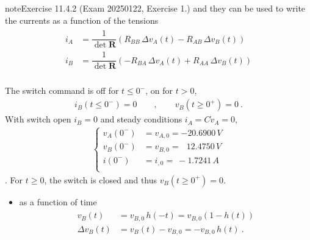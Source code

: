 \documentclass[letterpaper,10pt,english]{jupyterBook}
\begin{document}
\begin{sphinxadmonition}{note}{Exercise 11.4.2 (Exam 2025\sphinxhyphen{}01\sphinxhyphen{}22, Exercise 1.)}
\sphinxAtStartPar
and they can be used to write the currents as a function of the tensions
\begin{equation*}
\begin{split}\begin{aligned}
  i_A & = \dfrac{1}{\det \mathbf{R}} \left( R_{BB} \, \Delta v_A(t) - R_{AB} \, \Delta v_B(t) \right) \\
  i_B & = \dfrac{1}{\det \mathbf{R}} \left(-R_{BA} \, \Delta v_A(t) + R_{AA} \, \Delta v_B(t) \right) \\
\end{aligned}\end{split}
\end{equation*}


\sphinxAtStartPar
The switch command is off for \(t \le 0^-\), on for \(t > 0\),
\begin{equation*}
\begin{split}i_B(t \le 0^{-}) = 0 \qquad , \qquad v_B (t \ge 0^+) = 0 \ .\end{split}
\end{equation*}
\sphinxAtStartPar
{} With switch open \(i_B = 0\) and steady conditions \(i_A = C \dot{v}_A = 0\),
\begin{equation*}
\begin{split}\begin{cases}
  v_A(0^-) & = v_{A,0} =     - 20.6900 \, V \\
  v_B(0^-) & = v_{B,0} = \ \ \ 12.4750 \, V \\
    i(0^-) & = i_{ ,0} = \    - 1.7241 \, A \\
\end{cases}\end{split}
\end{equation*}
\sphinxAtStartPar
{}. For \(t \ge 0\), the switch is closed and thus \(v_B(t\ge 0^+) = 0\).
\begin{itemize}
\item {} 
\sphinxAtStartPar
{} as a function of time
\begin{equation*}
\begin{split}\begin{aligned}
     v_{B}(t) & = v_{B,0} \, h(-t) = v_{B,0} ( 1 - h(t) ) \\
     \Delta v_B(t) & = v_{B}(t) - v_{B,0} = - v_{B,0} \,  h(t) \ . 
   \end{aligned}\end{split}

\end{equation*}
\end{itemize}
\end{sphinxadmonition}
\end{document}

